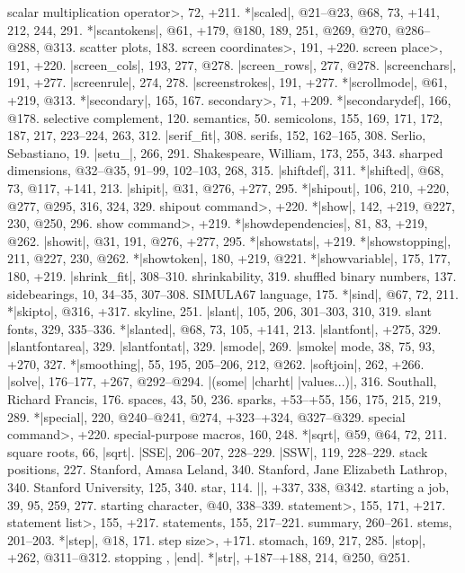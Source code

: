 \<scalar multiplication operator>, 72, +211.
*|scaled|, @21--@23, @68, 73, +141, 212, 244, 291.
*|scantokens|, @61, +179, @180, 189, 251, @269, @270, @286--@288, @313.
scatter plots, 183.
\<screen coordinates>, 191, +220.
\<screen place>, 191, +220.
|screen_cols|, 193, 277, @278.
|screen_rows|, 277, @278.
|screenchars|, 191, +277.
|screenrule|, 274, 278.
|screenstrokes|, 191, +277.
*|scrollmode|, @61, +219, @313.
*|secondary|, 165, 167.
\<secondary>, 71, +209.
*|secondarydef|, 166, @178.
selective complement, 120.
semantics, 50.
semicolons, 155, 169, 171, 172, 187, 217, 223--224, 263, 312.
|serif_fit|, 308.
serifs, 152, 162--165, 308.
Serlio, Sebastiano, 19.
|setu_|, 266, 291.
Shakespeare, William, 173, 255, 343.
sharped dimensions, @32--@35, 91--99, 102--103, 268, 315.
|shiftdef|, 311.
*|shifted|, @68, 73, @117, +141, 213.
|shipit|, @31, @276, +277, 295.
*|shipout|, 106, 210, +220, @277, @295, 316, 324, 329.
\<shipout command>, +220.
*|show|, 142, +219, @227, 230, @250, 296.
\<show command>, +219.
*|showdependencies|, 81, 83, +219, @262.
|showit|, @31, 191, @276, +277, 295.
*|showstats|, +219.
*|showstopping|, 211, @227, 230, @262.
*|showtoken|, 180, +219, @221.
*|showvariable|, 175, 177, 180, +219.
|shrink_fit|, 308--310.
shrinkability, 319.
shuffled binary numbers, 137.
sidebearings, 10, 34--35, 307--308.
{\sevenrm SIMULA67} language, 175.
*|sind|, @67, 72, 211.
*|skipto|, @316, +317.
skyline, 251.
|slant|, 105, 206, 301--303, 310, 319.
slant fonts, 329, 335--336.
*|slanted|, @68, 73, 105, +141, 213.
|slantfont|, +275, 329.
|slantfontarea|, 329.
|slantfontat|, 329.
|smode|, 269.
|smoke| mode, 38, 75, 93, +270, 327.
*|smoothing|, 55, 195, 205--206, 212, @262.
|softjoin|, 262, +266.
|solve|, 176--177, +267, @292--@294.
|(some| |charht| |values...)|, 316.
Southall, Richard Francis, 176.
spaces, 43, 50, 236.
sparks, +53--+55, 156, 175, 215, 219, 289.
*|special|, 220, @240--@241, @274, +323--+324, @327--@329.
\<special command>, +220.
special-purpose macros, 160, 248.
*|sqrt|, @59, @64, 72, 211.
square roots, 66, \also |sqrt|.
|SSE|, 206--207, 228--229.
|SSW|, 119, 228--229.
stack positions, 227.
Stanford, Amasa Leland, 340.
Stanford, Jane Elizabeth Lathrop, 340.
Stanford University, 125, 340.
star, 114.
|\startfont|, +337, 338, @342.
starting a job, 39, 95, 259, 277.
starting character, @40, 338--339.
\<statement>, 155, 171, +217.
\<statement list>, 155, +217.
statements, 155, 217--221.
\sub summary, 260--261.
stems, 201--203.
*|step|, @18, 171.
\<step size>, +171.
stomach, 169, 217, 285.
|stop|, +262, @311--@312.
stopping \MF, \see |end|.
*|str|, +187--+188, 214, @250, @251.

